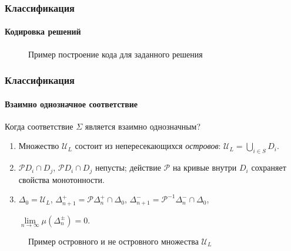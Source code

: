 \documentclass{beamer}
\begin{document}
\begin{frame}
	\frametitle{Классификация}
	\framesubtitle{Кодировка решений}
	
	\begin{figure}
		\caption{Пример построение кода для заданного решения}
		\label{pic:coding}
	\end{figure}
\end{frame}

\begin{frame}
	\frametitle{Классификация}
	\framesubtitle{Взаимно однозначное соответствие}
	
	Когда соответствие $\Sigma$ является взаимно однозначным?\footnotemark[3]
	\begin{enumerate}
		\item Множество $\mathcal{U}_L$ состоит из непересекающихся {\it островов}: $\mathcal{U}_L = \bigcup_{i \in S} D_i$.
		\item $\mathcal{P} D_i \cap D_j$, $\mathcal{P} D_i \cap D_j$ непусты; действие $\mathcal{P}$ на кривые внутри $D_i$ сохраняет свойства монотонности.
		\item $\Delta_0 = \mathcal{U}_L$, \quad $\Delta_{n + 1}^+ = \mathcal{P} \Delta_n^+ \cap \Delta_0$, \quad $\Delta_{n + 1}^- = \mathcal{P}^{-1} \Delta_n^- \cap \Delta_0$,\begin{center}
				$\lim \limits_{n \to \infty} \mu( \Delta_n^{\pm} ) = 0$.
			\end{center} 
	\end{enumerate}
	
	\begin{figure}
		\caption{Пример островного и не островного множества $\mathcal{U}_{L}$}
		\label{pic:coding}
	\end{figure}
	
\end{frame}
\end{document}
